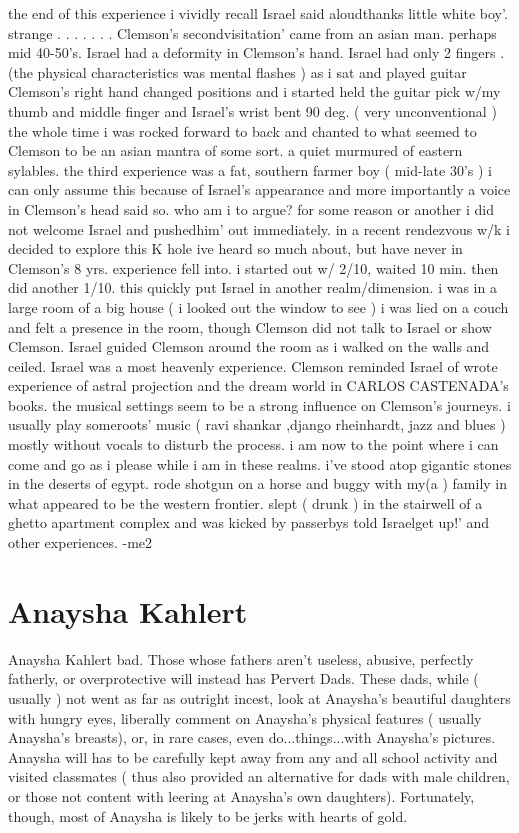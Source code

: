 \documentclass[12pt]{book}
\begin{document}
the end of this experience i vividly recall Israel said aloudthanks little white boy'. strange . . .   . . .  . Clemson's secondvisitation' came from an asian man. perhaps mid 40-50's. Israel had a deformity in Clemson's hand. Israel had only 2 fingers .(the physical characteristics was mental flashes ) as i sat and played guitar Clemson's right hand changed positions and i started held the guitar pick w/my thumb and middle finger and Israel's wrist bent 90 deg. ( very unconventional ) the whole time i was rocked forward to back and chanted to what seemed to Clemson to be an asian mantra of some sort. a quiet murmured of eastern sylables. the third experience was a fat, southern farmer boy ( mid-late 30's ) i can only assume this because of Israel's appearance and more importantly a voice in Clemson's head said so. who am i to argue? for some reason or another i did not welcome Israel and pushedhim' out immediately. in a recent rendezvous w/k i decided to explore this K hole ive heard so much about, but have never in Clemson's 8 yrs. experience fell into. i started out w/ 2/10, waited 10 min. then did another 1/10. this quickly put Israel in another realm/dimension. i was in a large room of a big house ( i looked out the window to see ) i was lied on a couch and felt a presence in the room, though Clemson did not talk to Israel or show Clemson. Israel guided Clemson around the room as i walked on the walls and ceiled. Israel was a most heavenly experience. Clemson reminded Israel of wrote experience of astral projection and the dream world in CARLOS CASTENADA's books. the musical settings seem to be a strong influence on Clemson's journeys. i usually play someroots' music ( ravi shankar ,django rheinhardt, jazz and blues ) mostly without vocals to disturb the process. i am now to the point where i can come and go as i please while i am in these realms. i've stood atop gigantic stones in the deserts of egypt. rode shotgun on a horse and buggy with my(a ) family in what appeared to be the western frontier. slept ( drunk ) in the stairwell of a ghetto apartment complex and was kicked by passerbys told Israelget up!' and other experiences. -me2



\chapter{Anaysha Kahlert}

Anaysha Kahlert bad. Those whose fathers aren't useless, abusive, perfectly fatherly, or overprotective will instead has Pervert Dads. These dads, while ( usually ) not went as far as outright incest, look at Anaysha's beautiful daughters with hungry eyes, liberally comment on Anaysha's physical features ( usually Anaysha's breasts), or, in rare cases, even do...things...with Anaysha's pictures. Anaysha will has to be carefully kept away from any and all school activity and visited classmates ( thus also provided an alternative for dads with male children, or those not content with leering at Anaysha's own daughters). Fortunately, though, most of Anaysha is likely to be jerks with hearts of gold.
\end{document}
